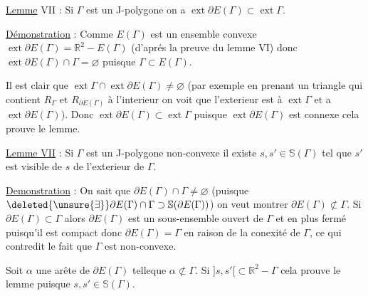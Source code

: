 \uline{Lemme} VII : Si $\Gamma$ est un J-polygone on a $\operatorname{ext}\partial E(\Gamma)\subset\operatorname{ext}\Gamma$.

\uline{Démonstration} : Comme $E(\Gamma)$ est un ensemble convexe $\operatorname{ext}\partial E(\Gamma)=\mathbb{R}^{2}-E(\Gamma)$ (d'aprés la preuve du lemme VI) donc $\operatorname{ext}\partial E(\Gamma)\cap\Gamma=\varnothing$ puisque $\Gamma\subset E(\Gamma)$.

Il est clair que $\operatorname{ext}\Gamma\cap\operatorname{ext}\partial E(\Gamma)\ne\varnothing$ (par exemple en prenant un triangle qui contient $R_{\Gamma}$ et $R_{\partial E(\Gamma)}$ à l'interieur on voit que l'exterieur est  à  $\operatorname{ext}\Gamma$ et a $\operatorname{ext}\partial E(\Gamma)$). Donc $\operatorname{ext}\partial E(\Gamma)\subset\operatorname{ext}\Gamma$ puisque $\operatorname{ext}\partial E(\Gamma)$ est connexe  cela prouve le lemme.

\uline{Lemme VII} : Si $\Gamma$ est un \inserted{(}J-\inserted{)}polygone non-convexe il existe $s,s'\in\mathbb{S}(\Gamma)$ tel que  $s'$ est visible de $s$ de l'exterieur de $\Gamma$.

\uline{Demonstration} : On sait que $\partial E(\Gamma)\cap\Gamma\ne\varnothing$ (puisque $\deleted{\unsure{\exists}}\partial E(\Gamma)\cap\Gamma\supset\mathbb{S}(\partial E(\Gamma))$) on veut montrer  $\partial E(\Gamma)\not\subset\Gamma$. Si $\partial E(\Gamma)\subset\Gamma$ alors  $\partial E(\Gamma)$ est un sous-ensemble ouvert de $\Gamma$ et en plus fermé puisqu'il est compact donc $\partial E(\Gamma)=\Gamma$ en raison de la conexité de $\Gamma$, ce qui contredit le fait que $\Gamma$ est non-convexe.

Soit $\alpha$\inserted{$=[s,s']$} une arête de $\partial E(\Gamma)$ telleque $\alpha\not\subset\Gamma$. Si $]s,s'[\subset\mathbb{R}^{2}-\Gamma$ cela prouve le lemme puisque $s,s'\in\mathbb{S}(\Gamma)$.

